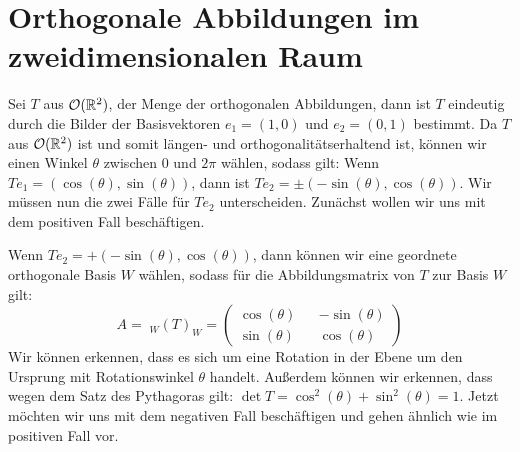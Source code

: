 \section{Orthogonale Abbildungen im zweidimensionalen Raum}
Sei $T$ aus ${\mathcal{O}(\mathbb{R}^2)}$, der Menge der orthogonalen Abbildungen, dann ist $T$ eindeutig durch die Bilder der Basisvektoren $e_1 = (1,0)$ und $e_2 = (0,1)$ bestimmt. Da $T$ aus ${\mathcal{O}(\mathbb{R}^2)}$ ist und somit längen- und orthogonalitätserhaltend ist, können wir einen Winkel $\theta$ zwischen $0$ und $2 \pi$ wählen, sodass gilt: Wenn $Te_1 = (\cos(\theta),\sin(\theta))$, dann ist $Te_2 = \pm (-\sin(\theta),\cos(\theta))$.
Wir müssen nun die zwei Fälle für $Te_2$ unterscheiden. Zunächst wollen wir uns mit dem positiven Fall beschäftigen. 

Wenn $Te_2 = + (-\sin(\theta),\cos(\theta))$, dann können wir eine geordnete orthogonale Basis $W$ wählen, sodass für die Abbildungsmatrix von $T$ zur Basis $W$ gilt:
$$A =\;_W\!(T)_W = \begin{pmatrix}
	\cos(\theta) && -\sin(\theta) \\
	\sin(\theta) && \cos(\theta)
\end{pmatrix} $$
Wir können erkennen, dass es sich um eine Rotation in der Ebene um den Ursprung mit Rotationswinkel $\theta$ handelt. Außerdem können wir erkennen, dass wegen dem Satz des Pythagoras gilt: $\det T = \cos^2(\theta) + \sin^2(\theta) = 1$.
Jetzt möchten wir uns mit dem negativen Fall beschäftigen und gehen ähnlich wie im positiven Fall vor.


